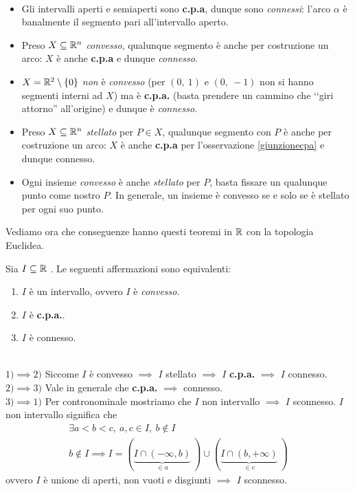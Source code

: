 \begin{example}~{}
\begin{itemize}
	\item Gli intervalli aperti e semiaperti sono \textbf{c.p.a}, dunque sono \textit{connessi}: l'arco $\alpha$ è banalmente il segmento pari all'intervallo aperto.
	\item Preso $X\subseteq\mathbb{R}^n$ \textit{convesso}, qualunque segmento è anche per costruzione un arco: $X$ è anche \textbf{c.p.a} e dunque \textit{connesso}.
	\item $X=\mathbb{R}^{2}\setminus\left\{0\right\}$ \textit{non} è \textit{convesso} (per $\left(0,\ 1\right)$ e $\left(0,\ -1\right)$ non si hanno segmenti interni ad $X$) ma è \textbf{c.p.a.} (basta prendere un cammino che ‘‘giri attorno'' all'origine) e dunque è \textit{connesso}.
	\item Preso $X\subseteq\mathbb{R}^n$ \textit{stellato} per $P\in X$, qualunque segmento con $P$ è anche per costruzione un arco: $X$ è anche \textbf{c.p.a} per l'osservazione \ref{giunzionecpa} e dunque {connesso}.
	\item Ogni insieme \textit{convesso} è anche \textit{stellato} per $P$, basta fissare un qualunque punto come nostro $P$. In generale, un insieme è convesso se e solo se è stellato per ogni suo punto.
\end{itemize}
\end{example}
Vediamo ora che conseguenze hanno questi teoremi in $\mathbb{R}$ con la topologia Euclidea.
\begin{theorema}
	Sia $I\subseteq \mathbb{R}$ . Le seguenti affermazioni sono equivalenti:
		\begin{enumerate}
	\item $I$ è un intervallo, ovvero $I$ è \textit{convesso}.
	\item $I$ è \textbf{c.p.a.}.
	\item $I$ è connesso.
		\end{enumerate}
\end{theorema}
\begin{demonstration}~{}\\
	$1) \implies 2)$ Siccome $I$ è convesso $\implies$ $I$ stellato $\implies$ $I$ \textbf{c.p.a.} $\implies$ $I$ connesso. \\
	$2) \implies 3)$ Vale in generale che \textbf{c.p.a.} $\implies$ connesso.\\
	$3) \implies 1)$ Per contronominale mostriamo che $I$ non intervallo $\implies$ $I$ sconnesso. $I$ non intervallo significa che 
		\begin{gather*}
			\exists a<b<c,\ a,c\in I,\ b\notin I \\
			b\notin I \implies I= \left(\underbrace{ I\cap \left(-\infty ,b\right)}_{\in a}\ \right) \cup \left( \underbrace{I\cap \left(b ,+\infty\right)}_{\in c}\ \right)
		\end{gather*}
	ovvero $I$ è unione di aperti, non vuoti e disgiunti $\implies$ $I$ sconnesso.	
\end{demonstration}
